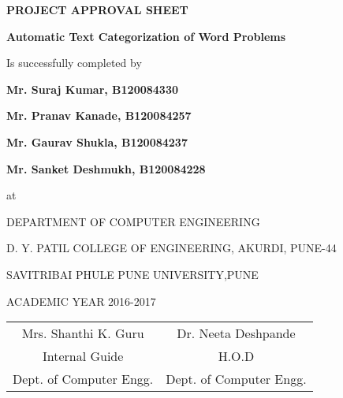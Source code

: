 \begin{center}
\textbf{PROJECT APPROVAL SHEET}
\end{center}
\begin{center}
\textbf{Automatic Text Categorization of Word Problems}
 \end{center} 

\begin{center}
Is successfully completed by 
\end{center}
\centerline{\textbf{Mr. Suraj Kumar, B120084330}} 
\centerline{\textbf{Mr. Pranav Kanade, B120084257}} 
\centerline{\textbf{Mr. Gaurav Shukla, B120084237}}
\centerline{\textbf{Mr. Sanket Deshmukh, B120084228}}
\begin{center}
 at
 \end{center} 
 \begin{center}
 DEPARTMENT OF COMPUTER ENGINEERING
 \end{center}
 \begin{center}
D. Y. PATIL COLLEGE OF ENGINEERING, AKURDI, PUNE-44
 \end{center}
 \begin{center}
 SAVITRIBAI PHULE PUNE UNIVERSITY,PUNE
 \end{center}
 
 \begin{center}
 ACADEMIC YEAR 2016-2017
 \end{center}
 
 \vspace*{1\baselineskip}
 \begin{tabular}{c c }
Mrs. Shanthi K. Guru &  \hspace{25 mm} Dr. Neeta Deshpande \\								
Internal Guide   &  \hspace{25 mm} H.O.D \\
Dept. of Computer Engg.  &	\hspace{25 mm}Dept. of Computer Engg.  \\
\end{tabular}
